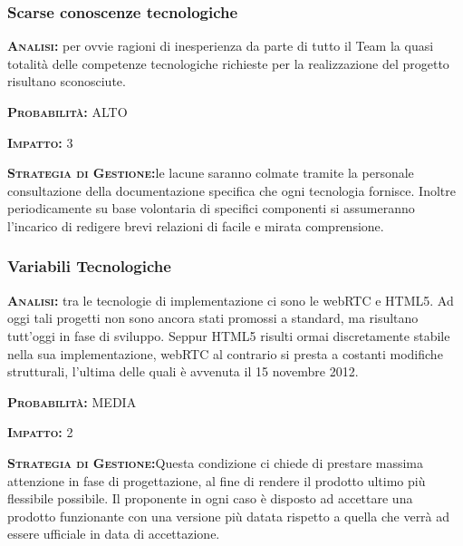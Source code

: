 \subsubsection{Scarse conoscenze tecnologiche}
\begin{description}
	\item{\scshape\bfseries Analisi:} per ovvie ragioni di inesperienza da parte di tutto il Team la quasi totalità delle competenze tecnologiche richieste per la realizzazione del progetto risultano sconosciute.
	\item{\scshape\bfseries Probabilità:} ALTO
	\item{\scshape\bfseries Impatto:} 3
	\item{\scshape\bfseries Strategia di Gestione:}le lacune saranno colmate tramite la personale consultazione della documentazione specifica che ogni tecnologia fornisce. Inoltre periodicamente su base volontaria di specifici componenti si assumeranno l'incarico di redigere brevi relazioni di facile e mirata comprensione.
\end{description}

\subsubsection{Variabili Tecnologiche}
\begin{description}
	\item{\scshape\bfseries Analisi:} tra le tecnologie di implementazione ci sono le webRTC e HTML5. Ad oggi tali progetti non sono ancora stati promossi a standard, ma risultano tutt'oggi in fase di sviluppo. Seppur HTML5 risulti ormai discretamente stabile nella sua implementazione, webRTC al contrario si presta a costanti modifiche strutturali, l'ultima delle quali è avvenuta il 15 novembre 2012.
	\item{\scshape\bfseries Probabilità:} MEDIA
	\item{\scshape\bfseries Impatto:} 2
	\item{\scshape\bfseries Strategia di Gestione:}Questa condizione ci chiede di prestare massima attenzione in fase di progettazione, al fine di rendere il prodotto ultimo più flessibile possibile. Il proponente in ogni caso è disposto ad accettare una prodotto funzionante con una versione più datata rispetto a quella che verrà ad essere ufficiale in data di accettazione.
\end{description}

